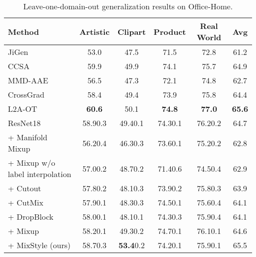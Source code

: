\documentclass{article} \usepackage{iclr2021_conference,times}
\newcommand{\tableCellHeight}{1}
\newcommand{\tabstyle}[1]{
  \setlength{\tabcolsep}{#1}
  \renewcommand{\arraystretch}{\tableCellHeight}
  \centering
}
\begin{document}
\begin{table}[t]
\tabstyle{6pt}
\caption{Leave-one-domain-out generalization results on Office-Home.}
\label{tab:result_office_home}
\begin{tabular}{l | c c c c | c}
\hline
Method & Artistic & Clipart & Product & Real World & Avg \\
\hline \hline
JiGen & 53.0 & 47.5 & 71.5 & 72.8 & 61.2 \\
CCSA & 59.9 & 49.9 & 74.1 & 75.7 & 64.9 \\
MMD-AAE & 56.5 & 47.3 & 72.1 & 74.8 & 62.7 \\
CrossGrad & 58.4 & 49.4 & 73.9 & 75.8 & 64.4 \\
L2A-OT & \textbf{60.6} & 50.1 & \textbf{74.8} & \textbf{77.0} & \textbf{65.6} \\
\hline
ResNet18 & 58.90.3 & 49.40.1 & 74.30.1 & 76.20.2 & 64.7 \\
+ Manifold Mixup & 56.20.4 & 46.30.3 & 73.60.1 & 75.20.2 & 62.8 \\
+ Mixup w/o label interpolation & 57.00.2 & 48.70.2 & 71.40.6 & 74.50.4 & 62.9 \\
+ Cutout & 57.80.2 & 48.10.3 & 73.90.2 & 75.80.3 & 63.9 \\
+ CutMix & 57.90.1 & 48.30.3 & 74.50.1 & 75.60.4 & 64.1 \\
+ DropBlock & 58.00.1 & 48.10.1 & 74.30.3 & 75.90.4 & 64.1 \\
+ Mixup & 58.20.1 & 49.30.2 & 74.70.1 & 76.10.1 & 64.6  \\
+ MixStyle (ours) & 58.70.3 & \textbf{53.4}0.2 & 74.20.1 & 75.90.1 & 65.5 \\
\hline
\end{tabular}
\end{table}
\end{document}
